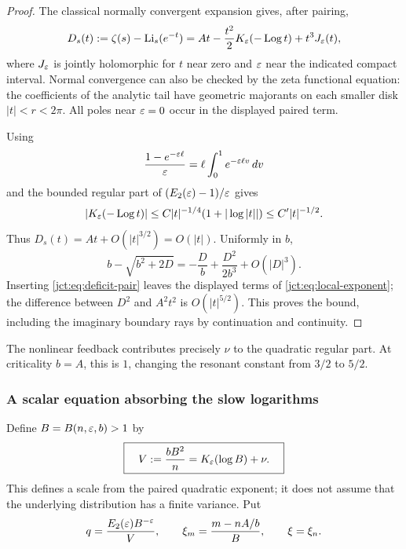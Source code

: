 \begin{proof}
The classical normally convergent expansion \cite[25.12.12]{rw:DLMFPolylog}
gives, after pairing,
\begin{equation}\label{jct:eq:deficit-pair}
 D_s(t):=\zeta(s)-\operatorname{Li}_s(e^{-t})
 =At-\frac{t^2}{2}K_\varepsilon(-\operatorname{Log} t)+t^3 J_\varepsilon(t),
\end{equation}
where $J_\varepsilon$ is jointly holomorphic for $t$ near zero and $\varepsilon$
near the indicated compact interval. Normal convergence can also be
checked by the zeta functional equation: the coefficients of the
analytic tail have geometric majorants on each smaller disk
$|t|<r<2\pi$. All poles near $\varepsilon=0$ occur in the displayed paired term.

Using
\[
 \frac{1-e^{-\varepsilon\ell}}{\varepsilon}
  =\ell\int_0^1e^{-\varepsilon\ell v}\,dv
\]
and the bounded regular part of $(E_2(\varepsilon)-1)/\varepsilon$ gives
\[
 |K_\varepsilon(-\operatorname{Log} t)|
 \le C|t|^{-1/4}(1+|\log|t||)\le C'|t|^{-1/2}.
\]
Thus $D_s(t)=At+O(|t|^{3/2})=O(|t|)$. Uniformly in $b$,
\[
 b-\sqrt{b^2+2D}
 =-\frac Db+\frac{D^2}{2b^3}+O(|D|^3).
\]
Inserting \eqref{jct:eq:deficit-pair} leaves the displayed terms of
\eqref{jct:eq:local-exponent}; the difference between $D^2$ and
$A^2t^2$ is $O(|t|^{5/2})$. This proves the bound, including the
imaginary boundary rays by continuation and continuity.
\end{proof}

The nonlinear feedback contributes precisely $\nu$ to the quadratic
regular part. At criticality $b=A$, this is $1$, changing the
resonant constant from $3/2$ to $5/2$.

\subsubsection{A scalar equation absorbing the slow logarithms}

Define $B=B(n,\varepsilon,b)>1$ by
\begin{equation}\label{jct:eq:scale}
 \boxed{\displaystyle\quad
 V:=\frac{bB^2}{n}=K_\varepsilon(\log B)+\nu.
 \quad}
\end{equation}
This defines a scale from the paired quadratic exponent; it does not
assume that the underlying distribution has a finite variance. Put
\begin{equation}\label{jct:eq:q-xi}
 q=\frac{E_2(\varepsilon)B^{-\varepsilon}}{V},\qquad
 \xi_m=\frac{m-nA/b}{B},\qquad \xi=\xi_n.
\end{equation}

